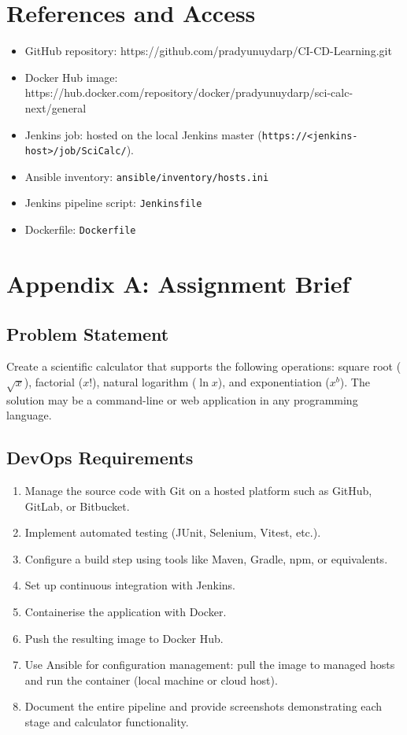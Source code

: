\documentclass[12pt]{article}
\begin{document}
\section{References and Access}
\begin{itemize}[leftmargin=*]
  \item GitHub repository:  https://github.com/pradyunuydarp/CI-CD-Learning.git
  \item Docker Hub image: https://hub.docker.com/repository/docker/pradyunuydarp/sci-calc-next/general
  \item Jenkins job: hosted on the local Jenkins master (\texttt{https://<jenkins-host>/job/SciCalc/}).
  \item Ansible inventory: \texttt{ansible/inventory/hosts.ini}
  \item Jenkins pipeline script: \texttt{Jenkinsfile}
  \item Dockerfile: \texttt{Dockerfile}
\end{itemize}

\section{Appendix A: Assignment Brief}
\subsection*{Problem Statement}
Create a scientific calculator that supports the following operations: square root (\(\sqrt{x}\)), factorial (\(x!\)), natural logarithm (\(\ln x\)), and exponentiation (\(x^b\)). The solution may be a command-line or web application in any programming language.

\subsection*{DevOps Requirements}
\begin{enumerate}[leftmargin=*]
  \item Manage the source code with Git on a hosted platform such as GitHub, GitLab, or Bitbucket.
  \item Implement automated testing (JUnit, Selenium, Vitest, etc.).
  \item Configure a build step using tools like Maven, Gradle, npm, or equivalents.
  \item Set up continuous integration with Jenkins.
  \item Containerise the application with Docker.
  \item Push the resulting image to Docker Hub.
  \item Use Ansible for configuration management: pull the image to managed hosts and run the container (local machine or cloud host).
  \item Document the entire pipeline and provide screenshots demonstrating each stage and calculator functionality.
\end{enumerate}
\end{document}
